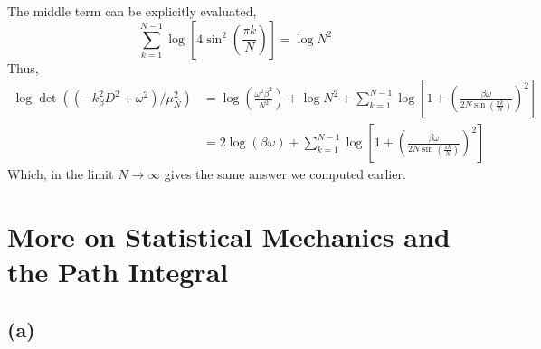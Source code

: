 \documentclass[12pt]{article}
\begin{document}
The middle term can be explicitly evaluated,
\[ \sum_{k = 1}^{N - 1} \log{\left[ 4 \sin^2{\left( \frac{\pi k}{N} \right)} \right]} = \log{N^2} \]
Thus,
\begin{align*}
\log{\det{((-k_{\beta}^2 D^2 + \omega^2)/\mu_N^2)}} & = \log{\left( \frac{\omega^2 \beta^2}{N^2} \right)} + \log{N^2} + \sum_{k = 1}^{N-1} \log{\left[ 1 + \left( \frac{\beta \omega}{2 N \sin{\left( \frac{\pi k}{N} \right)}} \right)^2 \right]}
\\
& = 2 \log{\left( \beta \omega \right)} + \sum_{k = 1}^{N-1} \log{\left[ 1 + \left( \frac{\beta \omega}{2 N \sin{\left( \frac{\pi k}{N} \right)}} \right)^2 \right]}
\end{align*}
Which, in the limit $N \to \infty$ gives the same answer we computed earlier. 

\section{More on Statistical Mechanics and the Path Integral}

\subsection{(a)}
\end{document}
